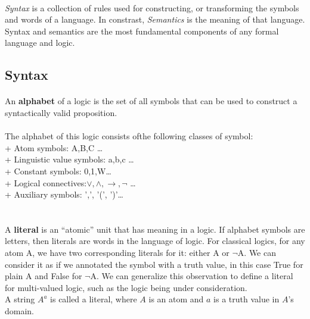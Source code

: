\documentclass[part1.tex]{subfiles}
\begin{document}
\paragraph{} {\em Syntax} is a collection of rules used for
constructing, or transforming the symbols and words of a
language. In constrast, {\em Semantics} is the meaning of that
language. Syntax and semantics are the most fundamental
components of any formal language and logic.
\subsection{Syntax}
\paragraph{} An {\bfseries alphabet} of a logic is the set of
all symbols that can be used to construct a syntactically valid
proposition.
\paragraph{} The alphabet of this logic consists
ofthe following classes of symbol:\\
\indent + Atom symbols: A,B,C \ldots\\
\indent + Linguistic value symbols: a,b,c \ldots\\
\indent + Constant symbols: 0,1,W\ldots\\
\indent + Logical connectives:\(\vee,\wedge,\to,\neg\) \ldots\\
\indent + Auxiliary symbols: ',', '(', ')'\ldots\\ \\
\paragraph{} A {\bfseries literal} is an ``atomic'' unit that
has meaning in a logic. If alphabet symbols are letters, then literals
are words in the language of logic. For classical logics, for any
atom A, we have two corresponding literals for
it: either A or $\neg{\text{A}}$. We can consider it as if we
annotated the symbol with a truth value, in this case True for
plain A and False for $\neg{\text{A}}$. We can generalize this
observation to define a literal for multi-valued logic, such as
the logic being under consideration.\\
A string \(A^a\) is called a literal, where
\(A\) is an atom and \(a\) is a truth value in \(A\)'s domain.
\end{document}
